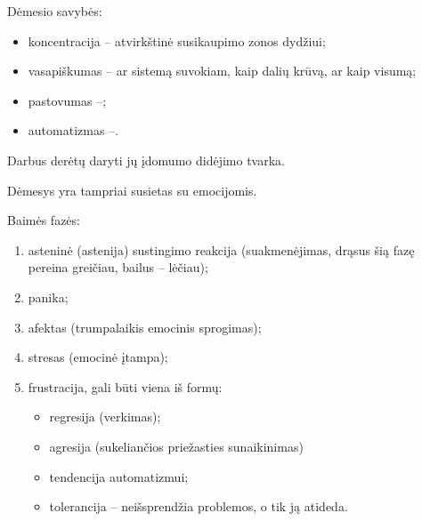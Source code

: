 Dėmesio savybės:

\begin{itemize}
  \item koncentracija – atvirkštinė susikaupimo zonos dydžiui;
  \item vasapiškumas – ar sistemą suvokiam, kaip dalių krūvą, ar kaip
    visumą; %
  \item pastovumas –;
  \item automatizmas –.  %
\end{itemize}

Darbus derėtų daryti jų įdomumo didėjimo tvarka.

Dėmesys yra tampriai susietas su emocijomis.

Baimės fazės:

\begin{enumerate}
  \item asteninė (\gls{astenija}) sustingimo reakcija (suakmenėjimas, 
    drąsus šią fazę pereina greičiau, bailus – lėčiau);
  \item panika;
  \item afektas (trumpalaikis emocinis sprogimas);
  \item stresas (emocinė įtampa);
  \item \gls{frustracija}, gali būti viena iš formų:
    \begin{itemize}
      \item \gls{regresija} (verkimas);
      \item agresija (sukeliančios priežasties sunaikinimas)
      \item tendencija automatizmui;
      \item tolerancija – neišsprendžia problemos, o tik ją atideda.
    \end{itemize}
\end{enumerate}

